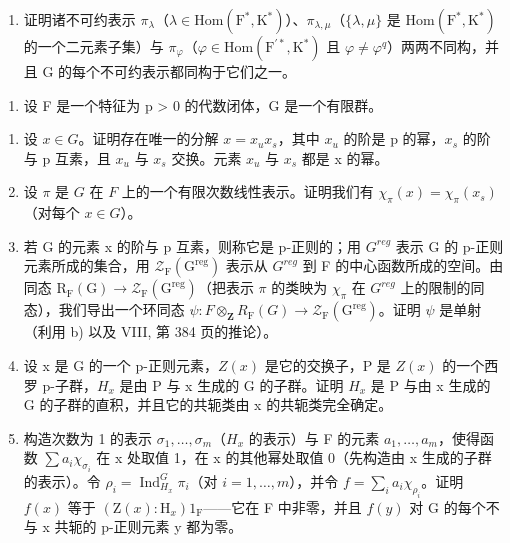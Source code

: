 \begin{enumerate}
\def\labelenumi{\alph{enumi})}
\setcounter{enumi}{4}
\tightlist
\item
  证明诸不可约表示 \(\pi_{\lambda}\)（\(\lambda\in\mathrm{Hom}(\mathrm{F}^{*},\mathrm{K}^{*})\)）、\(\pi_{\lambda,\mu}\)（\(\{\lambda,\mu\}\) 是 \(\mathrm{Hom}(\mathrm{F}^{*},\mathrm{K}^{*})\) 的一个二元素子集）与 \(\pi_{\varphi}\)（\(\varphi\in\mathrm{Hom}(\mathrm{F}^{\prime*},\mathrm{K}^{*})\) 且 \(\varphi\neq\varphi^{q}\)）两两不同构，并且 G 的每个不可约表示都同构于它们之一。
\end{enumerate}

\begin{enumerate}
\def\labelenumi{\arabic{enumi})}
\setcounter{enumi}{26}
\tightlist
\item
  设 F 是一个特征为 p \textgreater{} 0 的代数闭体，G 是一个有限群。
\end{enumerate}

\begin{enumerate}
\def\labelenumi{\alph{enumi})}
\item
  设 \(x \in G\)。证明存在唯一的分解 \(x = x_{u}x_{s}\)，其中 \(x_{u}\) 的阶是 p 的幂，\(x_{s}\) 的阶与 p 互素，且 \(x_{u}\) 与 \(x_{s}\) 交换。元素 \(x_{u}\) 与 \(x_{s}\) 都是 x 的幂。
\item
  设 \(\pi\) 是 \(G\) 在 \(F\) 上的一个有限次数线性表示。证明我们有 \(\chi_{\pi}(x) = \chi_{\pi}(x_s)\)（对每个 \(x \in G\)）。
\item
  若 G 的元素 x 的阶与 p 互素，则称它是 p-正则的；用 \(G^{reg}\) 表示 G 的 p-正则元素所成的集合，用 \(\mathcal{Z}_{\mathrm{F}}(\mathrm{G}^{\mathrm{reg}})\) 表示从 \(G^{reg}\) 到 F 的中心函数所成的空间。由同态 \(\mathrm{R}_{\mathrm{F}}(\mathrm{G}) \to \mathcal{Z}_{\mathrm{F}}(\mathrm{G}^{\mathrm{reg}})\)（把表示 \(\pi\) 的类映为 \(\chi_{\pi}\) 在 \(G^{reg}\) 上的限制的同态），我们导出一个环同态 \(\psi : F \otimes_{\mathbf{Z}} R_{\mathrm{F}}(G) \to \mathcal{Z}_{\mathrm{F}}(\mathrm{G}^{\mathrm{reg}})\)。证明 \(\psi\) 是单射（利用 b) 以及 VIII, 第 384 页的推论）。
\item
  设 x 是 G 的一个 p-正则元素，\(Z(x)\) 是它的交换子，P 是 \(Z(x)\) 的一个西罗 p-子群，\(H_{x}\) 是由 P 与 x 生成的 G 的子群。证明 \(H_{x}\) 是 P 与由 x 生成的 G 的子群的直积，并且它的共轭类由 x 的共轭类完全确定。
\item
  构造次数为 1 的表示 \(\sigma_{1},\ldots,\sigma_{m}\)（\(H_{x}\) 的表示）与 F 的元素 \(a_{1},\ldots,a_{m}\)，使得函数 \(\sum a_{i}\chi_{\sigma_{i}}\) 在 x 处取值 1，在 x 的其他幂处取值 0（先构造由 x 生成的子群的表示）。令 \(\rho_{i}=\operatorname{Ind}_{H_{x}}^{G}\pi_{i}\)（对 \(i=1,\ldots,m\)），并令 \(f=\sum_{i}a_{i}\chi_{\rho_{i}}\)。证明 \(f(x)\) 等于 \((\mathrm{Z}(x):\mathrm{H}_{x})1_{\mathrm{F}}\)——它在 F 中非零，并且 \(f(y)\) 对 G 的每个不与 x 共轭的 p-正则元素 y 都为零。
\end{enumerate}

